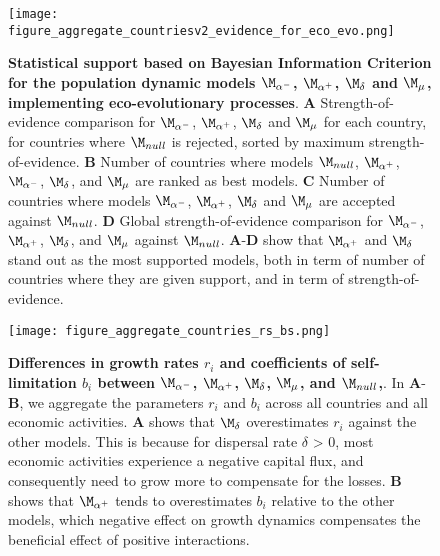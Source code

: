\begin{figure}
  \center
  \texttt{[image: figure\_aggregate\_countriesv2\_evidence\_for\_eco\_evo.png]}
  \caption{\small \textbf{Statistical support based on Bayesian Information Criterion for the population dynamic models $\modalphan$, $\modalphap$, $\M_\delta$ and $\modmu$, implementing eco-evolutionary processes}. 
  \textbf{A} Strength-of-evidence comparison for $\modalphan$, $\modalphap$, $\moddelta$ and $\modmu$ for each country, for countries where $\modnull$ is rejected, sorted by maximum strength-of-evidence. 
  \textbf{B} Number of countries where models $\modnull$, $\modalphap$, $\modalphan$, $\moddelta$, and $\modmu$ are ranked as best models. 
  \textbf{C} Number of countries where models $\modalphan$, $\modalphap$, $\moddelta$ and $\modmu$ are accepted against $\M_{null}$.
  \textbf{D} Global strength-of-evidence comparison for $\modalphan$, $\modalphap$, $\moddelta$, and $\modmu$ against $\modnull$.
  \textbf{A}-\textbf{D} show that $\modalphap$ and $\moddelta$ stand out as the most supported models, both in term of number of countries where they are given support, and in term of strength-of-evidence.
  }\label{fig:aggregate_countries}
\end{figure}
\FloatBarrier




\begin{figure}
  \center
  \texttt{[image: figure\_aggregate\_countries\_rs\_bs.png]}
  \caption{\small \textbf{Differences in growth rates $r_i$ and coefficients of self-limitation $b_i$ between $\modalphan$, $\modalphap$, $\moddelta$, $\modmu$, and $\modnull$,}. In \textbf{A}-\textbf{B}, we aggregate the parameters $r_i$ and $b_i$ across all countries and all economic activities. \textbf{A} shows that $\moddelta$ overestimates $r_i$ against the other models. This is because for dispersal rate $\delta$ > 0, most economic activities experience a negative capital flux, and consequently need to grow more to compensate for the losses. \textbf{B} shows that $\modalphap$ tends to overestimates $b_i$ relative to the other models, which negative effect on growth dynamics compensates the beneficial effect of positive interactions.
   }\label{fig:r_b}
\end{figure}
\FloatBarrier


